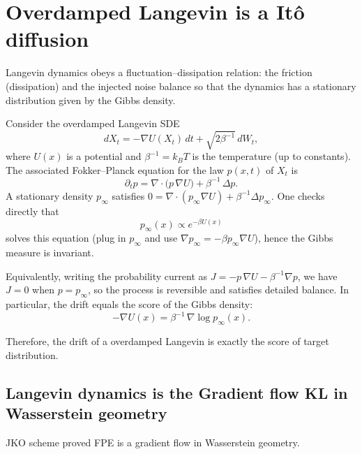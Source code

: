 \section*{Overdamped Langevin is a Itô diffusion}
Langevin dynamics obeys a fluctuation--dissipation relation: the friction (dissipation) and the injected noise balance so that the dynamics has a stationary distribution given by the Gibbs density.

Consider the overdamped Langevin SDE
\begin{equation}
  dX_t = -\nabla U(X_t)\,dt + \sqrt{2\beta^{-1}}\,dW_t,
\end{equation}
where $U(x)$ is a potential and $\beta^{-1}=k_B T$ is the temperature (up to constants). The associated Fokker--Planck equation for the law $p(x,t)$ of $X_t$ is
\begin{equation}
  \partial_t p = \nabla\cdot\bigl(p\,\nabla U\bigr) + \beta^{-1}\,\Delta p.
\end{equation}
A stationary density $p_\infty$ satisfies $0=\nabla\cdot(p_\infty\nabla U)+\beta^{-1}\Delta p_\infty$. One checks directly that
\begin{equation}
  p_\infty(x) \propto e^{-\beta U(x)}
\end{equation}
solves this equation (plug in $p_\infty$ and use $\nabla p_\infty=-\beta p_\infty\nabla U$), hence the Gibbs measure is invariant.

Equivalently, writing the probability current as $J = -p\,\nabla U - \beta^{-1}\nabla p$, we have $J=0$ when $p=p_\infty$, so the process is reversible and satisfies detailed balance. In particular, the drift equals the score of the Gibbs density:
\begin{equation}
  -\nabla U(x) = \beta^{-1}\,\nabla\log p_\infty(x).
\end{equation}

Therefore, the drift of a overdamped Langevin is exactly the score of target distribution.
\subsection{Langevin dynamics is the Gradient flow KL in Wasserstein geometry}
JKO scheme proved FPE is a gradient flow in Wasserstein geometry.

